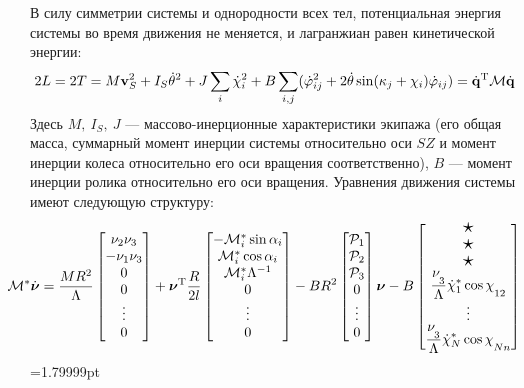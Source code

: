 В силу симметрии системы и однородности всех тел, потенциальная энергия системы во время движения не меняется, и лагранжиан равен кинетической энергии:
\begin{equation}\label{kin_en}
    \hspace{-10pt}
    2L = 2T = M\vec{v}_S^2 + I_S\dot{\theta}^2 + J\sum_i\dot{\chi}_i^2 + B\sum_{i,j}(\dot{\phi}_{ij}^2 + 2\dot{\theta}\sin(\kappa_j + \chi_i)\dot{\phi}_{ij})=\dot{\vec{q}}^\mathrm{T}\M\dot{\vec{q}}
\end{equation}
Здесь $M,\ I_S,\ J$ --- массово-инерционные характеристики экипажа (его общая масса,  суммарный момент инерции системы относительно оси $SZ$ и момент инерции колеса относительно его оси вращения соответственно), $B$ --- момент инерции ролика относительно его оси вращения.
Уравнения движения системы имеют следующую структуру:
\begin{eqnarray*}
    \hspace{-25pt}
    \M^*\dot{\vnu} = 
    \frac{MR^2}{\Lambda}\begin{bmatrix}
        \nu_2\nu_3\\
        -\nu_1\nu_3\\
        0\\
        0\\
        \vdots
        \\
        0
    \end{bmatrix}
    +\vnu^\mathrm{T}
    \frac{R}{2l}
    \begin{bmatrix}
        -\M^*_i \sin\alpha_i\\
        \M^*_i \cos\alpha_i\\
        \M^*_i \Lambda^{-1}\\
        0\\
        \vdots
        \\
        0
    \end{bmatrix}
    -BR^2
    \begin{bmatrix}
        \Prhs_1\\
        \Prhs_2\\
        \Prhs_3\\
        0\\
        \vdots
        \\
        0
    \end{bmatrix}
    \vnu
    -B\begin{bmatrix}
        \scalebox{1.5}{$\star$}\\
        \scalebox{1.5}{$\star$}\\
        \scalebox{1.5}{$\star$}\\
        \fontdimen16\textfont2=5pt
        \ddfrac{\nu_3}{\Lambda}\dot{\chi}_1^*\cos\chi_{12}\\
        \vdots
        \\
        \ddfrac{\nu_3}{\Lambda}\dot{\chi}_N^*\cos\chi_{Nn}
    \end{bmatrix}
\end{eqnarray*}
\begin{equation}\label{eq:full_system}
\end{equation}
=1.79999pt

